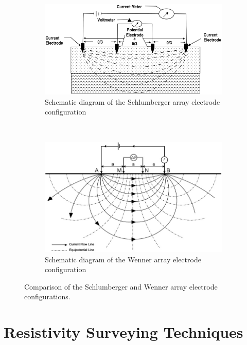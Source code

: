 \documentclass[12pt,a4paper]{report}
\begin{document}
\begin{figure}[H]
    \centering
    \begin{subfigure}[t]{0.9\textwidth}
        \centering
        \includegraphics[height=0.3\textheight]{sclumberger.png}
        \caption{Schematic diagram of the Schlumberger array electrode configuration}
        \label{fig:schlumberger}
    \end{subfigure}\\[2cm]
    \vspace{1cm}
    \begin{subfigure}[t]{0.9\textwidth}
        \centering
        \includegraphics[height=0.35\textheight]{wenner.png}
        \caption{Schematic diagram of the Wenner array electrode configuration}
        \label{fig:wenner}
    \end{subfigure}
    \caption{Comparison of the Schlumberger and Wenner array electrode configurations.}
    \label{fig:configurations}
\end{figure}

\section{Resistivity Surveying Techniques}
\end{document}
